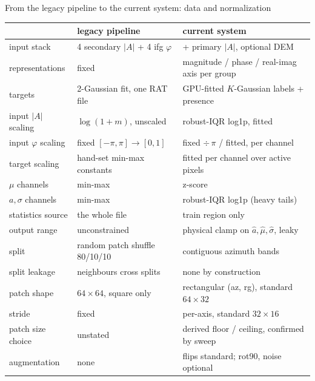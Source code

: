 \begin{frame}{From the legacy pipeline to the current system: data and normalization}
  \centering
  \scriptsize
  \renewcommand{\arraystretch}{1.12}
  \begin{tabular}{@{}l p{4.9cm} p{6.1cm}@{}}
    \toprule
    & \textbf{legacy pipeline} & \textbf{current system} \\
    \midrule
    input stack         & 4 secondary $|A|$ + 4 ifg $\varphi$         & + primary $|A|$, optional DEM \\
    representations     & fixed                                       & magnitude / phase / real-imag axis per group \\
    targets             & 2-Gaussian fit, one RAT file                & GPU-fitted $K$-Gaussian labels + presence \\
    \addlinespace[3pt]
    input $|A|$ scaling & $\log(1{+}m)$, unscaled                     & robust-IQR log1p, fitted \\
    input $\varphi$ scaling & fixed $[-\pi,\pi] \to [0,1]$            & fixed $\div\,\pi$ / fitted, per channel \\
    target scaling      & hand-set min-max constants                  & fitted per channel over active pixels \\
    $\mu$ channels      & min-max                                     & z-score \\
    $a, \sigma$ channels& min-max                                     & robust-IQR log1p (heavy tails) \\
    statistics source   & the whole file                              & train region only \\
    output range        & unconstrained                               & physical clamp on $\hat a, \hat\mu, \hat\sigma$, leaky \\
    \addlinespace[3pt]
    split               & random patch shuffle 80/10/10               & contiguous azimuth bands \\
    split leakage       & neighbours cross splits                     & none by construction \\
    patch shape         & $64 \times 64$, square only                 & rectangular (az, rg), standard $64{\times}32$ \\
    stride              & fixed                                       & per-axis, standard $32{\times}16$ \\
    patch size choice   & unstated                                    & derived floor / ceiling, confirmed by sweep \\
    augmentation        & none                                        & flips standard; rot90, noise optional \\
    \bottomrule
  \end{tabular}
\end{frame}

